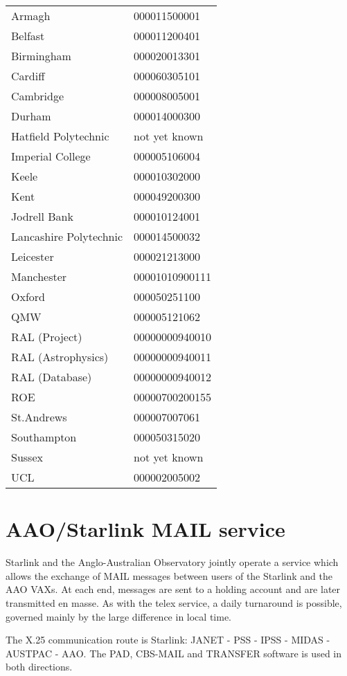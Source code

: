 \begin{center}\begin{tabular}{l@{\hspace{1cm}}l}
Armagh & 000011500001 \\
Belfast & 000011200401 \\
Birmingham & 000020013301 \\
Cardiff & 000060305101 \\
Cambridge & 000008005001 \\
Durham & 000014000300 \\
Hatfield Polytechnic & not yet known \\
Imperial College & 000005106004 \\
Keele & 000010302000 \\
Kent & 000049200300 \\
Jodrell Bank & 000010124001 \\
Lancashire Polytechnic & 000014500032 \\
Leicester & 000021213000 \\
Manchester & 00001010900111 \\
Oxford & 000050251100 \\
QMW & 000005121062 \\
RAL (Project) & 00000000940010 \\
RAL (Astrophysics) & 00000000940011 \\
RAL (Database) & 00000000940012 \\
ROE &00000700200155 \\
St.Andrews & 000007007061 \\
Southampton & 000050315020 \\
Sussex & not yet known \\
UCL & 000002005002 
\end{tabular}\end{center}

\section{AAO/Starlink MAIL service}
\label{aao-mail}

Starlink and the Anglo-Australian Observatory jointly operate a service which
allows the exchange of MAIL messages between users of the Starlink and the AAO
VAXs.
At each end, messages are sent to a holding account and are later transmitted
en masse.
As with the telex service, a daily turnaround is possible, governed mainly by
the large difference in local time.

The X.25 communication route is Starlink: JANET - PSS - IPSS - MIDAS - AUSTPAC
- AAO.
The PAD, CBS-MAIL and TRANSFER software is used in both directions.

